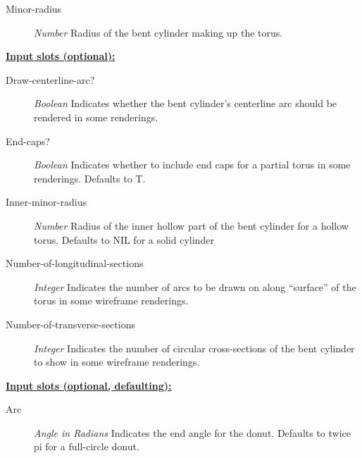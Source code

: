 \documentclass [11pt]{book}
\begin{document}
\begin{itemize}
\begin{description}
\item [Minor-radius]
\emph{Number} Radius of the bent cylinder making up the torus.


\end{description}






\textbf{
\underline{Input slots (optional):}}

\begin{description}

\item [Draw-centerline-arc?]
\emph{Boolean} Indicates whether the bent cylinder's centerline arc should be rendered in some renderings.


\item [End-caps?]
\emph{Boolean} Indicates whether to include end caps for a partial torus in some renderings. Defaults to T.


\item [Inner-minor-radius]
\emph{Number} Radius of the inner hollow part of the bent cylinder for a hollow torus. Defaults to NIL for a solid cylinder


\item [Number-of-longitudinal-sections]
\emph{Integer} Indicates the number of arcs to be drawn on along ``surface'' of the torus in some wireframe renderings.


\item [Number-of-transverse-sections]
\emph{Integer} Indicates the number of circular cross-sections of the bent cylinder to show in some wireframe renderings.


\end{description}






\textbf{
\underline{Input slots (optional, defaulting):}}

\begin{description}

\item [Arc]
\emph{Angle in Radians} Indicates the end angle for the donut. Defaults to twice pi for a full-circle donut.


\end{description}







\end{itemize}
\end{document}
